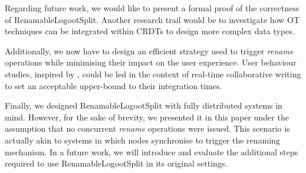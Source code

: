 \documentclass[sigplan,10pt,authorversion]{acmart}
\begin{document}
Regarding future work, we would like to present a formal proof of the correctness of RenamableLogootSplit.
Another research trail would be to investigate how OT techniques can be integrated within \acp{CRDT} to design more complex data types.


Additionally, we now have to design an efficient strategy used to trigger \emph{rename} operations while minimising their impact on the user experience.
User behaviour studies, inspired by \cite{ignat:hal-01088815,ignat:hal-01238831}, could be led in the context of real-time collaborative writing to set an acceptable upper-bound to their integration times.

Finally, we designed RenamableLogootSplit with fully distributed systems in mind.
However, for the sake of brevity, we presented it in this paper under the assumption that no concurrent \emph{rename} operations were issued.
This scenario is actually akin to systems in which nodes synchronise to trigger the renaming mechanism.
In a future work, we will introduce and evaluate the additional steps required to use RenamableLogootSplit in its original settings.


\end{document}
